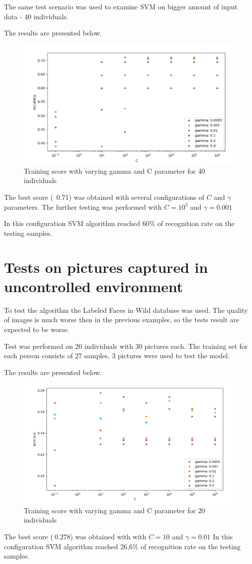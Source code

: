 The same test scenario was used to examine SVM on bigger amount of input data - 40 individuals.

The results are presented below.

\begin{figure}[H]
\centering
\includegraphics[scale=0.8]{img/svm/gamma_C_40i.png}
\caption{Training score with varying gamma and C parameter for 40 individuals}
\end{figure} 

The best score (~0.71) was obtained with several configurations of $C$ and $\gamma$ parameters. The further testing was performed with $C = 10^3$ and $\gamma = 0.001$

In this configuration SVM algorithm reached 60\% of recognition rate on the testing samples.


\section{Tests on pictures captured in uncontrolled environment}

To test the algorithm the Labeled Faces in Wild database was used. The quality of images is much worse then in the previous examples, so the tests result are expected to be worse. 

Test was performed on 20 individuals with 30 pictures each. The training set for each person consists of 27 samples, 3 pictures were used to test the model. 

The results are presented below.

\begin{figure}[H]
\centering
\includegraphics[scale=0.75]{img/svm/lfw/gamma_C_20i.png}
\caption{Training score with varying gamma and C parameter for 20 individuals}
\end{figure} 

The best score ($~0.278$) was obtained with with $C = 10$ and $\gamma = 0.01$
In this configuration SVM algorithm reached 26,6\% of recognition rate on the testing samples.

